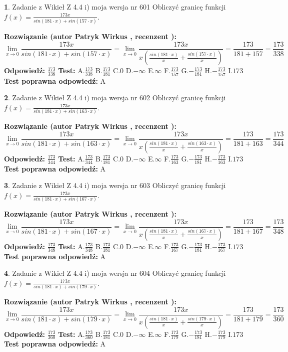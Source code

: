 \documentclass[12pt, a4paper]{article}
\theoremstyle{definition} %
\newtheorem{zad}{}
\newcommand{\zadStart}[1]{\begin{zad}#1\newline}
\newcommand{\zadStop}{\end{zad}}
\newcommand{\rozwStart}[2]{\noindent \textbf{Rozwiązanie (autor #1 , recenzent #2): }\newline}
\newcommand{\rozwStop}{\newline}
\newcommand{\odpStart}{\noindent \textbf{Odpowiedź:}\newline}
\newcommand{\odpStop}{\newline}
\newcommand{\testStart}{\noindent \textbf{Test:}\newline}
\newcommand{\testStop}{\newline}
\newcommand{\kluczStart}{\noindent \textbf{Test poprawna odpowiedź:}\newline}
\newcommand{\kluczStop}{\newline}
\begin{document}
\zadStart{Zadanie z Wikieł Z 4.4 i) moja wersja nr 601}
Obliczyć granicę funkcji $f(x)=\frac{173x}{sin(181\cdot x) +sin(157\cdot x)}$.
\zadStop
\rozwStart{Patryk Wirkus}{}
$$\lim\limits_{x\to 0}\frac{173x}{sin(181\cdot x) +sin(157\cdot x)}=\lim\limits_{x\to 0}\frac{173x}{x(\frac{sin(181\cdot x)}{x}+\frac{sin(157\cdot x)}{x})}=\frac{173}{181+157} = \frac{173}{338}$$
\rozwStop
\odpStart
$\frac{173}{338}$
\odpStop
\testStart
A.$\frac{173}{338}$
B.$\frac{173}{181}$
C.$0$
D.$-\infty$
E.$\infty$
F.$\frac{173}{157}$
G.$-\frac{173}{181}$
H.$-\frac{173}{157}$
I.$173$
\testStop
\kluczStart
A
\kluczStop



\zadStart{Zadanie z Wikieł Z 4.4 i) moja wersja nr 602}
Obliczyć granicę funkcji $f(x)=\frac{173x}{sin(181\cdot x) +sin(163\cdot x)}$.
\zadStop
\rozwStart{Patryk Wirkus}{}
$$\lim\limits_{x\to 0}\frac{173x}{sin(181\cdot x) +sin(163\cdot x)}=\lim\limits_{x\to 0}\frac{173x}{x(\frac{sin(181\cdot x)}{x}+\frac{sin(163\cdot x)}{x})}=\frac{173}{181+163} = \frac{173}{344}$$
\rozwStop
\odpStart
$\frac{173}{344}$
\odpStop
\testStart
A.$\frac{173}{344}$
B.$\frac{173}{181}$
C.$0$
D.$-\infty$
E.$\infty$
F.$\frac{173}{163}$
G.$-\frac{173}{181}$
H.$-\frac{173}{163}$
I.$173$
\testStop
\kluczStart
A
\kluczStop



\zadStart{Zadanie z Wikieł Z 4.4 i) moja wersja nr 603}
Obliczyć granicę funkcji $f(x)=\frac{173x}{sin(181\cdot x) +sin(167\cdot x)}$.
\zadStop
\rozwStart{Patryk Wirkus}{}
$$\lim\limits_{x\to 0}\frac{173x}{sin(181\cdot x) +sin(167\cdot x)}=\lim\limits_{x\to 0}\frac{173x}{x(\frac{sin(181\cdot x)}{x}+\frac{sin(167\cdot x)}{x})}=\frac{173}{181+167} = \frac{173}{348}$$
\rozwStop
\odpStart
$\frac{173}{348}$
\odpStop
\testStart
A.$\frac{173}{348}$
B.$\frac{173}{181}$
C.$0$
D.$-\infty$
E.$\infty$
F.$\frac{173}{167}$
G.$-\frac{173}{181}$
H.$-\frac{173}{167}$
I.$173$
\testStop
\kluczStart
A
\kluczStop



\zadStart{Zadanie z Wikieł Z 4.4 i) moja wersja nr 604}
Obliczyć granicę funkcji $f(x)=\frac{173x}{sin(181\cdot x) +sin(179\cdot x)}$.
\zadStop
\rozwStart{Patryk Wirkus}{}
$$\lim\limits_{x\to 0}\frac{173x}{sin(181\cdot x) +sin(179\cdot x)}=\lim\limits_{x\to 0}\frac{173x}{x(\frac{sin(181\cdot x)}{x}+\frac{sin(179\cdot x)}{x})}=\frac{173}{181+179} = \frac{173}{360}$$
\rozwStop
\odpStart
$\frac{173}{360}$
\odpStop
\testStart
A.$\frac{173}{360}$
B.$\frac{173}{181}$
C.$0$
D.$-\infty$
E.$\infty$
F.$\frac{173}{179}$
G.$-\frac{173}{181}$
H.$-\frac{173}{179}$
I.$173$
\testStop
\kluczStart
A
\kluczStop
\end{document}
